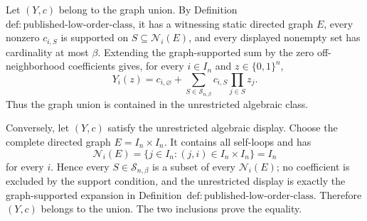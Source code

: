 Let \((Y,c)\) belong to the graph union.  By Definition~\(\mathrm{def{:}published\text{-}low\text{-}order\text{-}class}\), it has a witnessing static directed graph \(E\), every nonzero \(c_{i,S}\) is supported on \(S\subseteq\mathcal N_i(E)\), and every displayed nonempty set has cardinality at most \(\beta\).  Extending the graph-supported sum by the zero off-neighborhood coefficients gives, for every \(i\in I_n\) and \(z\in\{0,1\}^n\),
\[
Y_i(z)=c_{i,\varnothing}+
\sum_{S\in\mathcal S_{n,\beta}}c_{i,S}\prod_{j\in S}z_j.
\]
Thus the graph union is contained in the unrestricted algebraic class.

Conversely, let \((Y,c)\) satisfy the unrestricted algebraic display.  Choose the complete directed graph \(E=I_n\times I_n\).  It contains all self-loops and has
\[
\mathcal N_i(E)=\{j\in I_n:(j,i)\in I_n\times I_n\}=I_n
\]
for every \(i\).  Hence every \(S\in\mathcal S_{n,\beta}\) is a subset of every \(\mathcal N_i(E)\); no coefficient is excluded by the support condition, and the unrestricted display is exactly the graph-supported expansion in Definition~\(\mathrm{def{:}published\text{-}low\text{-}order\text{-}class}\).  Therefore \((Y,c)\) belongs to the union.  The two inclusions prove the equality.